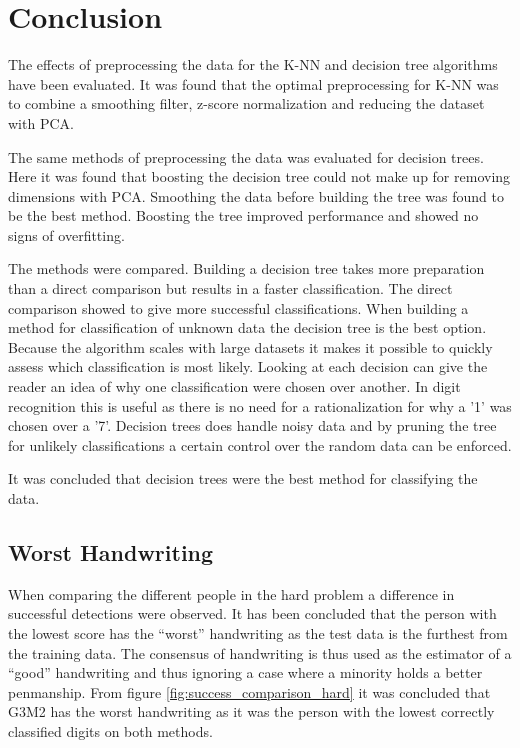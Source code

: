 \section{Conclusion}

The effects of preprocessing the data for the K-NN and decision tree algorithms have been evaluated.
It was found that the optimal preprocessing for K-NN was to combine a smoothing filter, z-score normalization and reducing the dataset with PCA.

The same methods of preprocessing the data was evaluated for decision trees. 
Here it was found that boosting the decision tree could not make up for removing dimensions with PCA.
Smoothing the data before building the tree was found to be the best method.
Boosting the tree improved performance and showed no signs of overfitting.

The methods were compared. 
Building a decision tree takes more preparation than a direct comparison but results in a faster classification.
The direct comparison showed to give more successful classifications.
When building a method for classification of unknown data the decision tree is the best option.
Because the algorithm scales with large datasets it makes it possible to quickly assess which classification is most likely.
Looking at each decision can give the reader an idea of why one classification were chosen over another.
In digit recognition this is useful as there is no need for a rationalization for why a '1' was chosen over a '7'. 
Decision trees does handle noisy data and by pruning the tree for unlikely classifications a certain control over the random data can be enforced.

It was concluded that decision trees were the best method for classifying the data. 

\subsection{Worst Handwriting}

When comparing the different people in the hard problem a difference in successful detections were observed.
It has been concluded that the person with the lowest score has the ``worst'' handwriting as the test data is the furthest from the training data.
The consensus of handwriting is thus used as the estimator of a ``good'' handwriting and thus ignoring a case where a minority holds a better penmanship.
From figure \ref{fig:success_comparison_hard} it was concluded that 
G3M2
has the worst handwriting as it was the person with the lowest correctly classified digits on both methods.